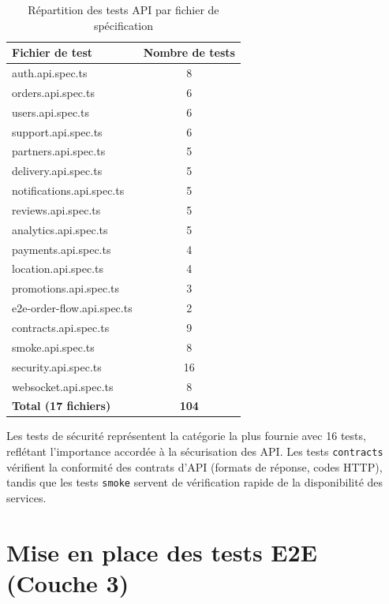 \begin{table}[H]
\centering
\caption{Répartition des tests API par fichier de spécification}
\label{tab:api-tests}
\begin{tabular}{l c}
\toprule
\textbf{Fichier de test} & \textbf{Nombre de tests} \\
\midrule
auth.api.spec.ts            &  8 \\
orders.api.spec.ts          &  6 \\
users.api.spec.ts           &  6 \\
support.api.spec.ts         &  6 \\
partners.api.spec.ts        &  5 \\
delivery.api.spec.ts        &  5 \\
notifications.api.spec.ts   &  5 \\
reviews.api.spec.ts         &  5 \\
analytics.api.spec.ts       &  5 \\
payments.api.spec.ts        &  4 \\
location.api.spec.ts        &  4 \\
promotions.api.spec.ts      &  3 \\
e2e-order-flow.api.spec.ts  &  2 \\
contracts.api.spec.ts       &  9 \\
smoke.api.spec.ts           &  8 \\
security.api.spec.ts        & 16 \\
websocket.api.spec.ts       &  8 \\
\midrule
\textbf{Total (17 fichiers)} & \textbf{104} \\
\bottomrule
\end{tabular}
\end{table}

Les tests de sécurité représentent la catégorie la plus fournie avec 16 tests,
reflétant l'importance accordée à la sécurisation des API. Les tests
\texttt{contracts} vérifient la conformité des contrats d'API (formats de réponse,
codes HTTP), tandis que les tests \texttt{smoke} servent de vérification rapide
de la disponibilité des services.

\section{Mise en place des tests E2E (Couche 3)}
\label{sec:tests-e2e}

